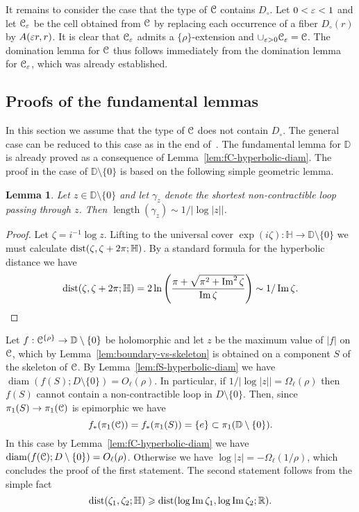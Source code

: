 \documentclass[reqno]{amsart}
\newtheorem{Lem}[Cor]{Lemma}{\bfseries}{\itshape}
\renewcommand\ge{\geqslant} \renewcommand\le{\leqslant}
\renewcommand\~[1]{\widetilde{#1}}
\def\length{\operatorname{length}}
\def\diam{\operatorname{diam}} \def\ord{\operatorname{ord}}
\def\H{{\mathbb H}}
\def\D{{\mathbb D}}
\def\he#1{{\{#1\}}}
\def\hrho{{\he\rho}}
\begin{document}
It remains to consider the case that the type of ${\mathcal C}$ contains
$D_\circ$. Let $0<\varepsilon<1$ and let ${\mathcal C}_\varepsilon$ be the cell obtained from
${\mathcal C}$ by replacing each occurrence of a fiber $D_\circ(r)$ by
$A(\varepsilon r,r)$. It is clear that ${\mathcal C}_\varepsilon$ admits a $\hrho$-extension and
$\cup_{\varepsilon>0}{\mathcal C}_\varepsilon={\mathcal C}$. The domination lemma for ${\mathcal C}$ thus follows
immediately from the domination lemma for ${\mathcal C}_\varepsilon$, which was already
established.

\subsection{Proofs of the fundamental lemmas}

In this section we assume that the type of ${\mathcal C}$ does not contain
$D_\circ$. The general case can be reduced to this case as in the end
of~. The fundamental lemma for $\D$ is
already proved as a consequence of
Lemma~\ref{lem:fC-hyperbolic-diam}. The proof in the case of
$\D\setminus\{0\}$ is based on the following simple geometric lemma.

\begin{Lem}
  Let $z\in\D\setminus\{0\}$ and let $\gamma_z$ denote the shortest
  non-contractible loop passing through $z$. Then
  $\length(\gamma_z)\sim1/|\log|z||$.
\end{Lem}
\begin{proof}
  Let $\zeta=i^{-1}\log z$. Lifting to the universal cover
  $\exp(i\zeta):\H\to\D\setminus\{0\}$ we must calculate
  $\dist(\zeta,\zeta+2\pi;\H)$. By a standard formula for the
  hyperbolic distance we have
  \begin{equation}
    \dist(\zeta,\zeta+2\pi;\H) = 2\ln\left(\frac{\pi+\sqrt{\pi^2+\Im^2\zeta}}{\Im\zeta}\right)
    \sim 1/\Im\zeta.
  \end{equation}
\end{proof}

Let $f:\cC^\hrho\to\D\setminus\{0\}$ be holomorphic and let $z$ be the
maximum value of $|f|$ on ${\mathcal C}$, which by
Lemma~\ref{lem:boundary-vs-skeleton} is obtained on a component $S$ of
the skeleton of ${\mathcal C}$. By Lemma~\ref{lem:fS-hyperbolic-diam} we have
$\diam(f(S);D\setminus\{0\})=O_\ell(\rho)$. In particular, if
$1/|\log|z||=\Omega_\ell(\rho)$ then $f(S)$ cannot contain a
non-contractible loop in $D\setminus\{0\}$. Then, since
$\pi_1(S)\to\pi_1({\mathcal C})$ is epimorphic we have
\begin{equation}
  f_*(\pi_1(\cC))=f_*(\pi_1(S))=\{e\}\subset\pi_1(\D\setminus\{0\}).
\end{equation}
In this case by Lemma~\ref{lem:fC-hyperbolic-diam} we have
$\diam(f(\cC);D\setminus\{0\})=O_\ell(\rho)$. Otherwise we have
$\log|z|=-\Omega_\ell(1/\rho)$, which concludes the proof of the first
statement. The second statement follows from the simple fact
\begin{equation}
  \dist(\zeta_1,\zeta_2;\H) \ge \dist(\log\Im\zeta_1,\log\Im\zeta_2;\R).
\end{equation}
\end{document}
